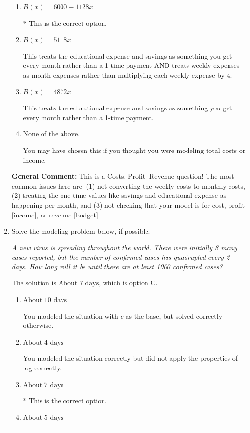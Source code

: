 \documentclass{extbook}[14pt]
\newcommand{\litem}[1]{\item #1

\rule{\textwidth}{0.4pt}}
\begin{document}
\begin{enumerate}
{\begin{enumerate}[label=\Alph*.]
This treats weekly expenses as month expenses rather than multiplying each weekly expense.
\item \( B(x) = 6000 - 1128 x \)

* This is the correct option.
\item \( B(x) = 5118 x \)

This treats the educational expense and savings as something you get every month rather than a 1-time payment AND treats weekly expenses as month expenses rather than multiplying each weekly expense by 4.
\item \( B(x) = 4872 x \)

This treats the educational expense and savings as something you get every month rather than a 1-time payment.
\item \( \text{None of the above.} \)

You may have chosen this if you thought you were modeling total costs or income.
\end{enumerate}

\textbf{General Comment:} This is a Costs, Profit, Revenue question! The most common issues here are: (1) not converting the weekly costs to monthly costs, (2) treating the one-time values like savings and educational expense as happening per month, and (3) not checking that your model is for cost, profit [income], or revenue [budget].
}
\litem{
Solve the modeling problem below, if possible.

\begin{center}
    \textit{ A new virus is spreading throughout the world. There were initially 8 many cases reported, but the number of confirmed cases has quadrupled every 2 days. How long will it be until there are at least 1000 confirmed cases? }
\end{center}


The solution is \( \text{About } 7 \text{ days} \), which is option C.\begin{enumerate}[label=\Alph*.]
\item \( \text{About } 10 \text{ days} \)

You modeled the situation with $e$ as the base, but solved correctly otherwise.
\item \( \text{About } 4 \text{ days} \)

You modeled the situation correctly but did not apply the properties of log correctly.
\item \( \text{About } 7 \text{ days} \)

* This is the correct option.
\item \( \text{About } 5 \text{ days} \)


\end{enumerate}}
\end{enumerate}
\end{document}
